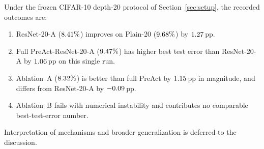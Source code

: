 Under the frozen CIFAR-10 depth-20 protocol of Section~\ref{sec:setup}, the recorded outcomes are:
\begin{enumerate}
  \item ResNet-20-A ($8.41\%$) improves on Plain-20 ($9.68\%$) by
        $1.27$\,pp.
  \item Full PreAct-ResNet-20-A ($9.47\%$) has higher best test error than ResNet-20-A by
        $1.06$\,pp on this single run.
  \item Ablation~A ($8.32\%$) is better than full PreAct by
        $1.15$\,pp in magnitude, and differs from ResNet-20-A by
        $-0.09$\,pp.
  \item Ablation~B fails with numerical instability and contributes no comparable
        best-test-error number.
\end{enumerate}
Interpretation of mechanisms and broader generalization is deferred to the discussion.

